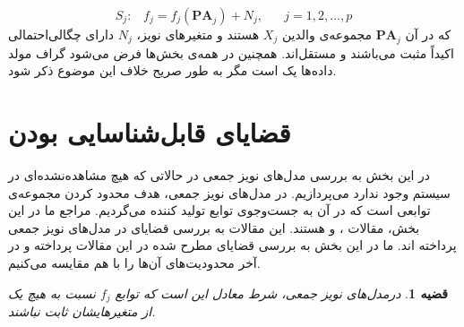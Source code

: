 \documentclass[a4paper,12pt]{article}
\newtheorem{thm}{{\large\bf قضیه}}[section]
\begin{document}
	\begin{equation}
	S_j:\;\;\;f_j=f_j(\textbf{PA}_j) + N_j, \;\;\;\;\;\; j = 1,2,...,p
	\end{equation}
	که در آن 
	$\textbf{PA}_j$
	مجموعه‌ی والدین $X_j$ هستند و متغیرهای نویز، $N_j$ دارای چگالی‌احتمالی اکیداً مثبت می‌باشند و مستقل‌اند. همچنین در همه‌ی بخش‌ها فرض می‌شود گراف مولد داده‌ها یک 
	است مگر به طور صریح خلاف این موضوع ذکر شود.
	

\section{قضایای قابل‌شناسایی بودن}
در این بخش به بررسی مدل‌های نویز جمعی در حالاتی که هیچ 
مشاهده‌نشده‌ای در سیستم وجود ندارد می‌پردازیم. در مدل‌های نویز جمعی، هدف محدود کردن مجموعه‌ی توابعی است که در آن به جست‌و‌جوی توابع تولید کننده  
می‌گردیم.
مراجع ما در این بخش، مقالات 
\cite{hoyer}،
\cite{continous}
و
\cite{postnonlinear}
هستند. این مقالات به بررسی قضایای 
در مدل‌های نویز جمعی پرداخته اند. ما در این بخش به بررسی قضایای مطرح شده در این مقالات پرداخته و در آخر محدودیت‌های  آن‌ها را با هم مقایسه ‌می‌کنیم.

\begin{thm}
	درمدل‌های نویز جمعی، شرط  
	معادل این است که توابع $f_j$ نسبت به هیچ یک از متغیرهایشان ثابت نباشند.
\end{thm}
\end{document}
